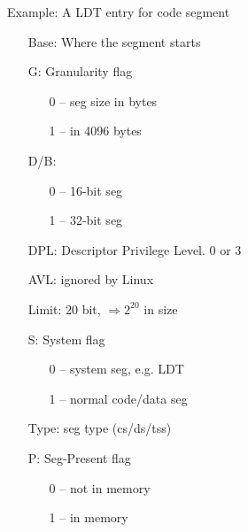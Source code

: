 \begin{frame}%
  \begin{iblock}{Example: A LDT entry for code segment}
    \begin{center}
    \end{center}
  \end{iblock}{\small
    \begin{multicols}{2}
      \begin{itemize}
      \item[Base:] Where the segment starts
      \item[G:] Granularity flag\par
        \begin{itemize}
        \item[0] -- seg size in bytes
        \item[1] -- in 4096 bytes
        \end{itemize}
    \item[D/B:]
      \begin{itemize}
      \item[0] -- 16-bit seg          
      \item[1] -- 32-bit seg
      \end{itemize}
    \item[DPL:] Descriptor Privilege Level. 0 or 3
    \item[AVL:] ignored by Linux
    \item[Limit:] 20 bit, \(\Rightarrow{}2^{20}\) in size
    \item[S:] System flag\par
      \begin{itemize}
      \item[0] -- system seg, e.g. LDT
      \item[1] -- normal code/data seg
      \end{itemize}
    \item[Type:] seg type (cs/ds/tss)
    \item[P:] Seg-Present flag\par
      \begin{itemize}
      \item[0] -- not in memory
      \item[1] -- in memory
      \end{itemize}
    \end{itemize}
  \end{multicols}}
\end{frame}

